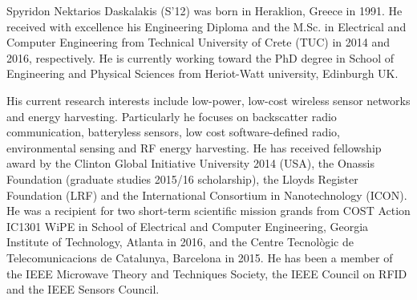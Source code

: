 \documentclass[journal]{IEEEtran}
\begin{document}
\begin{IEEEbiography}
{Spyridon Nektarios Daskalakis} (S'12) was born in Heraklion, Greece in 1991. He received with excellence his Engineering Diploma and the M.Sc. in Electrical and Computer Engineering from Technical University of Crete (TUC) in 2014 and 2016, respectively. He is currently working toward the PhD degree in School of Engineering and Physical Sciences from Heriot-Watt university, Edinburgh UK. 

His current research interests include low-power, low-cost wireless sensor networks and energy harvesting. Particularly he focuses on backscatter radio communication, batteryless sensors, low cost software-defined radio, environmental sensing and RF energy harvesting. 
He has received fellowship award by the Clinton Global Initiative University 2014 (USA), the Onassis Foundation (graduate studies 2015/16 scholarship), the Lloyds Register Foundation (LRF) and the International Consortium in Nanotechnology (ICON). He was a recipient for two short-term scientific mission grands from COST Action IC1301 WiPE in School of Electrical and Computer Engineering, Georgia Institute of Technology, Atlanta in 2016, and the Centre Tecnològic de Telecomunicacions de Catalunya, Barcelona in 2015. He has been a member of the IEEE Microwave Theory and Techniques Society, the IEEE Council on RFID and the IEEE Sensors Council.
\end{IEEEbiography}
\end{document}
